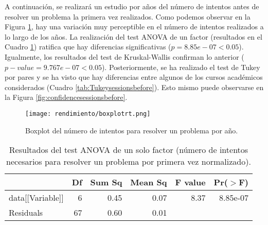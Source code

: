 A continuación, se realizará un estudio por años del número de intentos antes de resolver un problema la primera vez realizados. Como podemos observar en la Figura \ref{fig:boxplotsessionsbefore}, hay una variación muy perceptible en el número de intentos realizados a lo largo de los años. La realización del test ANOVA de un factor (resultados en el Cuadro \ref{tab:ANOVAsessionsbefore}) ratifica que hay diferencias significativas ($p = 8.85e-07 < 0.05$). Igualmente, los resultados del test de Kruskal-Wallis confirman lo anterior ($p-value = 9.767e-07 < 0.05$). Posteriormente, se ha realizado el test de Tukey por pares y se ha visto que hay diferencias entre algunos de los cursos académicos considerados (Cuadro \ref{tab:Tukeysessionsbefore}). Esto mismo puede observarse en la Figura \ref{fig:confidencesessionsbefore}.

\begin{figure}[H]
    \centering
    \texttt{[image: rendimiento/boxplotrt.png]}
    \caption{Boxplot del número de intentos para resolver un problema por año.}
    \label{fig:boxplotsessionsbefore}
\end{figure}

\begin{table}[H]
\centering
\caption{Resultados del test ANOVA de un solo factor (número de intentos necesarios para resolver un problema por primera vez normalizado).}
\label{tab:ANOVAsessionsbefore}
\begin{tabular}{lrrrrr}
  \hline
 & Df & Sum Sq & Mean Sq & F value & Pr($>$F) \\ 
  \hline
data[[Variable]] & 6 & 0.45 & 0.07 & 8.37 & 8.85e-07 \\ 
  Residuals        & 67 & 0.60 & 0.01 &  &  \\ 
   \hline
\end{tabular}
\end{table}

